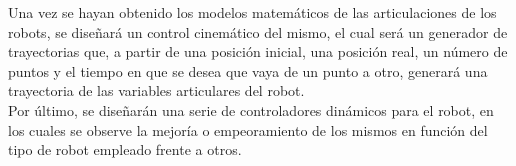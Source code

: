 \documentclass[a4paper,twoside]{article}
\begin{document}
Una vez se hayan obtenido los modelos matemáticos de las articulaciones de los robots, se diseñará un control cinemático del mismo, el cual será un generador de trayectorias que, a partir de una posición inicial, una posición real, un número de puntos y el tiempo en que se desea que vaya de un punto a otro, generará una trayectoria de las variables articulares del robot.\\

Por último, se diseñarán una serie de controladores dinámicos para el robot, en los cuales se observe la mejoría o empeoramiento de los mismos en función del tipo de robot empleado frente a otros.
\newpage

\newpage

\newpage

\newpage
%
\newpage

\newpage

\end{document}
